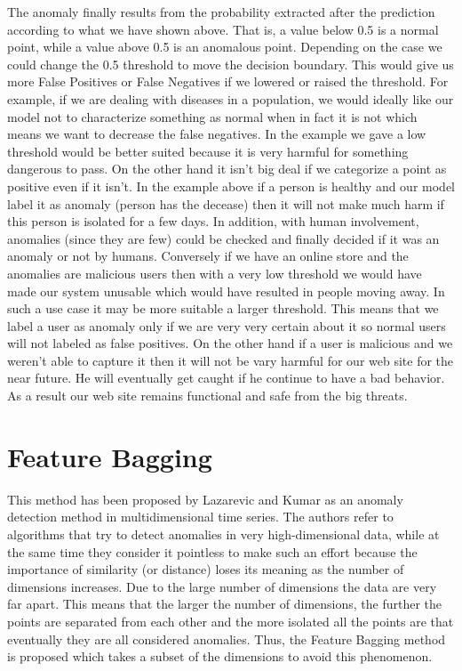 \documentclass[a4paper,12pt]{report}
\theoremstyle{definitionNODot}
\begin{document}
	The anomaly finally results from the probability extracted after the prediction according to what we have shown above. That is, a value below 0.5 is a normal point, while a value above 0.5 is an anomalous point. Depending on the case we could change the 0.5 threshold to move the decision boundary. This would give us more False Positives or False Negatives if we lowered or raised the threshold. For example, if we are dealing with diseases in a population, we would ideally like our model not to characterize something as normal when in fact it is not which means we want to decrease the false negatives. In the example we gave a low threshold would be better suited because it is very harmful for something dangerous to pass. On the other hand it isn't big deal if we categorize a point as positive even if it isn't. In the example above if a person is healthy and our model label it as anomaly (person has the decease) then it will not make much harm if this person is isolated for a few days. In addition, with human involvement, anomalies (since they are few) could be checked and finally decided if it was an anomaly or not by humans. Conversely if we have an online store and the anomalies are malicious users then with a very low threshold we would have made our system unusable which would have resulted in people moving away. In such a use case it may be more suitable a larger threshold. This means that we label a user as anomaly only if we are very very certain about it so normal users will not labeled as false positives. On the other hand if a user is malicious and we weren't able to capture it then it will not be vary harmful for our web site for the near future. He will eventually get caught if he continue to have a bad behavior. As a result our web site remains functional and safe from the big threats.
	
	\section{Feature Bagging}
	
	This method has been proposed by Lazarevic and Kumar \cite{lazarevicKumar2005Featurebagging} as an anomaly detection method in multidimensional time series. The authors refer to algorithms that try to detect anomalies in very high-dimensional data, while at the same time they consider it pointless to make such an effort because the importance of similarity (or distance) loses its meaning as the number of dimensions increases. Due to the large number of dimensions the data are very far apart. This means that the larger the number of dimensions, the further the points are separated from each other and the more isolated all the points are that eventually they are all considered anomalies. Thus, the Feature Bagging method is proposed which takes a subset of the dimensions to avoid this phenomenon. 
	
\end{document}
